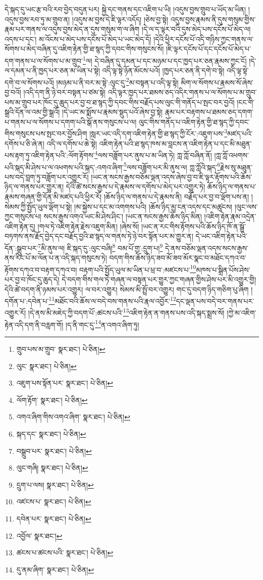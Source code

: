དེ་སྐད་དུ་ཡང་རྩ་བའི་རབ་བྱེད་བདུན་པར། སྐྱེ་དང་གནས་དང་འཇིག་པ་ཡི། །འདུས་བྱས་གྲུབ་པ་ཡོད་མ་ཡིན། །འདུས་བྱས་རབ་ཏུ་མ་གྲུབ་ན། །འདུས་མ་བྱས་དེ་ཇི་ལྟར་འདོད། །ཅེས་བྱ་སྟེ། འདུས་བྱས་རྣམས་ནི་དུས་གསུམ་གྱིས་རྣམ་པར་གནས་ལ་འདུས་བྱས་མེད་ན་དུས་གསུམ་ག་ལ་ཞིག །དེ་ལ་ད་ལྟར་བའི་དུས་མེད་པས་དངོས་པོ་མེད་ལ། འདས་པ་དང་། མ་འོངས་པ་མེད་པས་དངོས་པོ་མེད་པ་ཡང་མེད་དོ། །དེའི་ཕྱིར་དངོས་པོ་འདི་གཉིས་ཀྱང་གནས་ལ་སོགས་པ་མེད་བཞིན་དུ་འཇིག་རྟེན་གྱི་ཐ་སྙད་ཀྱི་དབང་གིས་གསུངས་སོ། །ཇི་ལྟར་དངོས་པོ་དང་དངོས་པོ་མེད་པ་དག་གནས་པ་ལ་སོགས་པ་མ་གྲུབ་\footnote{གྲུབ་པས་མ་གྲུབ་  སྣར་ཐང་།  པེ་ཅིན། }ལ། དེ་བཞིན་དུ་དམན་པ་དང་མཉམ་པ་དང་ཁྱད་པར་ཅན་རྣམས་ཀྱང་ངོ། །དེ་ལ་དམན་པ་ནི་ཁྱད་པར་ཅན་མ་ཡིན་པ་སྟེ། འདི་ལྟ་སྟེ་ཉོན་མོངས་པའོ། །ཁྱད་པར་ཅན་ནི་དགེ་བ་སྟེ། འདི་ལྟ་སྟེ་དགེ་བ་ལ་སོགས་པའོ། །མཉམ་པ་ནི་བར་མ་སྟེ་:ལུང་དུ་\footnote{ལུང་  སྣར་ཐང་།  པེ་ཅིན། }མ་བསྟན་པ་འདི་ལྟ་སྟེ། མིག་ལ་སོགས་པ་རྣམས་སོ་ཞེས་བྱ་བའོ། །འདི་དག་ནི་ཉེ་བར་བསྟན་པ་ཙམ་སྟེ། འདི་ལྟར་ཁྱད་པར་ཐམས་ཅད་འདིར་གནས་པ་ལ་སོགས་པ་མ་གྲུབ་པས་མ་གྲུབ་པར་ཁོང་དུ་ཆུད་པར་བྱ་བ་ཐ་སྙད་ཀྱི་དབང་གིས་བརྗོད་པས་ལུང་གི་གནོད་པ་སྤང་བར་བྱའོ། །ངང་གི་སྒྲའི་དོན་ལ་འམ་གྱི་སྒྲའོ། །དེ་ཡང་མ་སྨོས་པ་རྣམས་སྡུད་པའོ་ཞེས་བྱ་སྟེ། རྣམ་པར་བརྟགས་པ་ཐམས་ཅད་དགག་པ་གནས་པ་ལ་སོགས་པ་དགག་པའི་སྒོ་ནས་གསུངས་པ་ལ། ལུང་གིས་གནོད་པ་འཇིག་རྟེན་གྱི་ཐ་སྙད་ཀྱི་དབང་གིས་གསུངས་པས་སྤང་བར་བྱོས་ཤིག །སླར་ཡང་འདི་དག་འཇིག་རྟེན་གྱི་ཐ་སྙད་ཀྱི་ངོར་:འཇུག་པས་\footnote{འཇུག་པས་སྟོན་པར་  སྣར་ཐང་།  པེ་ཅིན། }མཛད་པའི་དགོས་པ་ཅི་ཞེ་ན། འདི་ལ་དགོས་པ་ཆེ་སྟེ། འཇིག་རྟེན་པའི་ཐ་སྙད་ཁས་མ་བླངས་ན་འཇིག་རྟེན་པ་དང་མི་མཐུན་པས་རྟག་ཏུ་འཇིག་རྟེན་པའི་:ལོག་རྟོགས་\footnote{ལོག་རྟོག་  སྣར་ཐང་།  པེ་ཅིན། }ལས་བཟློག་པར་ནུས་པ་མ་ཡིན་ཏེ། ཀླ་ཀློ་བཞིན་ནོ། །ཀླ་ཀློ་འཕགས་པའི་སྐད་མི་ཤེས་པ་ལ་འཕགས་པའི་སྐད་:འགའ་ཞིག་\footnote{འགའ་ཞིག་གིས་འགའ་ཞིག་  སྣར་ཐང་།  པེ་ཅིན། }ལས་བཟློག་པར་མི་ནུས་ལ། ཀླ་ཀློའི་སྐད་\footnote{སྐད་དང་  སྣར་ཐང་།  པེ་ཅིན། }རྗེས་སུ་མཐུན་པས་བདེ་བླག་ཏུ་བཟློག་པར་འགྱུར་རོ། །ཡང་ན་སངས་རྒྱས་བཅོམ་ལྡན་འདས་ཞེས་བྱ་བ་ཇི་ལྟར་རྟོགས་པའི་ཆོས་ཉིད་ལ་གནས་པར་གྱུར་ན། དེའི་ཚེ་སངས་རྒྱས་པ་དེ་རྣམས་ལ་དགོས་པ་མེད་པར་འགྱུར་ཏེ། ཆོས་ཉིད་ལ་གནས་པ་རྣམས་གཞན་གྱི་དོན་མི་མཛད་པའི་ཕྱིར་རོ། །ཆོས་ཉིད་ལ་གནས་པ་དེ་རྣམས་ནི། བརྗོད་པར་བྱ་བ་ལྡོག་པས་ན། །སེམས་ཀྱི་སྤྱོད་ཡུལ་ལྡོག་པ་སྟེ། །མ་སྐྱེས་པ་དང་མ་འགགས་པའི། །ཆོས་ཉིད་མྱ་ངན་འདས་དང་མཚུངས། །ལུང་ལས་ཀྱང་གསུངས་པ། སངས་རྒྱས་འགའ་ཡང་མི་ཤེས་ཤིང་། །ཡང་ན་སངས་རྒྱས་ཆོས་ཉིད་མིན། །འཇིག་རྟེན་རྣམ་འདྲེན་འཇིག་རྟེན་དུ། །གལ་ཏེ་འཇིག་རྟེན་རྗེས་འཇུག་མིན། །ཞེས་སོ། །ཡང་ན་རང་གིས་རྟོགས་པའི་ཆོས་ཉིད་ཁོ་ན་སྒྲོ་བཏགས་ནས་རྗོད་བྱེད་དང་བརྗོད་བྱའི་ཐ་སྙད་ལ་གནས་ཏེ་ཉེ་བར་སྟོན་པར་མ་གྱུར་ན། དེ་ཡང་འཇིག་རྟེན་པའི་དོན་:སྒྲུབ་པར་\footnote{བསྒྲུབ་པར་  སྣར་ཐང་།  པེ་ཅིན། }མི་ནུས་ལ། ཇི་སྐད་དུ་:ལུང་བཞི།\footnote{ལུང་གཞི།  སྣར་ཐང་།  པེ་ཅིན། } བམ་པོ་གྱ་:དྲུག་པ།\footnote{དྲུག་པ་ལས།  སྣར་ཐང་།  པེ་ཅིན། } དེ་ནས་བཅོམ་ལྡན་འདས་སངས་རྒྱས་ནས་རིང་པོ་མ་ལོན་པ་ན་འདི་སྐད་གསུངས་ཏེ། བདག་གིས་ཆོས་ཉིད་ཟབ་མོ་ཟབ་མོར་སྣང་བ་མཐོང་དཀའ་བ་རྟོགས་དཀའ་བ་བརྟག་དཀའ་བ། བརྟག་པའི་སྤྱོད་ཡུལ་མ་ཡིན་པ་ཕྲ་བ་:མཛངས་པ་\footnote{འཛངས་པ་  སྣར་ཐང་།  པེ་ཅིན། }མཁས་པ་སྒྲིན་པོས་ཤེས་པར་བྱ་བ་ཁོང་དུ་ཆུད་དེ། དེ་བདག་གིས་གལ་ཏེ་གཞན་ལ་བསྟན་པར་གྱུར་ཀྱང་གཞན་གྱིས་ཤེས་པར་མི་འགྱུར་གྱི། དེའི་ཚེ་བདག་ནི་ཉམས་པར་འགྱུར། ལ་བར་འགྱུར། སེམས་མི་སྤྲོ་བར་འགྱུར། གང་དུ་བདག་ཉིད་གཅིག་པུ་ཞིག །དགོན་པ་:དབེན་པ་\footnote{དབེན་པར་  སྣར་ཐང་།  པེ་ཅིན། }མཐོང་བའི་ཆོས་ལ་བདེ་བས་གནས་པའི་རྣལ་འབྱོར་\footnote{འབྱོལ་  སྣར་ཐང་། }དང་ལྡན་པས་བདེ་བར་གནས་པར་འགྱུར་རོ། །དེ་ནས་མི་མཇེད་ཀྱི་བདག་པོ་:ཚངས་པའི་\footnote{ཚངས་པ་ཚངས་པའི་  སྣར་ཐང་།  པེ་ཅིན། }འཇིག་རྟེན་ན་གནས་པས་འདི་སྐད་སྨྲས་སོ། །ཀྱེ་མ་འཇིག་རྟེན་འདི་དག་ནི་བརླག་གོ། །ད་ནི་གང་དུ་\footnote{དུ་ནམ་ཞིག་  སྣར་ཐང་།  པེ་ཅིན། }ན་འགའ་ཞིག་ཏུ། 